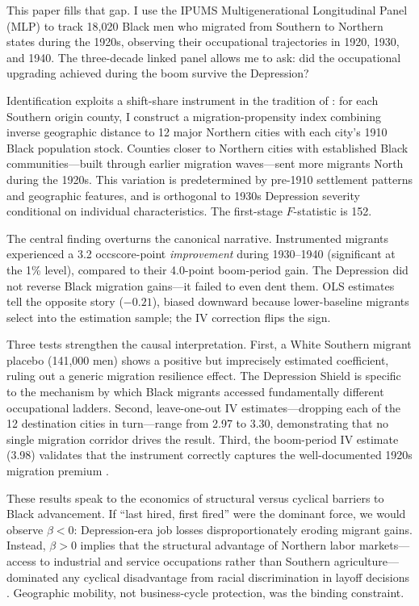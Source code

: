 \documentclass[12pt]{article}
\begin{document}
This paper fills that gap. I use the IPUMS Multigenerational Longitudinal Panel (MLP) to track 18,020 Black men who migrated from Southern to Northern states during the 1920s, observing their occupational trajectories in 1920, 1930, and 1940. The three-decade linked panel allows me to ask: did the occupational upgrading achieved during the boom survive the Depression?

Identification exploits a shift-share instrument in the tradition of \citet{card2001}: for each Southern origin county, I construct a migration-propensity index combining inverse geographic distance to 12 major Northern cities with each city's 1910 Black population stock. Counties closer to Northern cities with established Black communities---built through earlier migration waves---sent more migrants North during the 1920s. This variation is predetermined by pre-1910 settlement patterns and geographic features, and is orthogonal to 1930s Depression severity conditional on individual characteristics. The first-stage $F$-statistic is 152.

The central finding overturns the canonical narrative. Instrumented migrants experienced a 3.2 occscore-point \textit{improvement} during 1930--1940 (significant at the 1\% level), compared to their 4.0-point boom-period gain. The Depression did not reverse Black migration gains---it failed to even dent them. OLS estimates tell the opposite story ($-0.21$), biased downward because lower-baseline migrants select into the estimation sample; the IV correction flips the sign.

Three tests strengthen the causal interpretation. First, a White Southern migrant placebo (141,000 men) shows a positive but imprecisely estimated coefficient, ruling out a generic migration resilience effect. The Depression Shield is specific to the mechanism by which Black migrants accessed fundamentally different occupational ladders. Second, leave-one-out IV estimates---dropping each of the 12 destination cities in turn---range from 2.97 to 3.30, demonstrating that no single migration corridor drives the result. Third, the boom-period IV estimate (3.98) validates that the instrument correctly captures the well-documented 1920s migration premium \citep{collins2014}.

These results speak to the economics of structural versus cyclical barriers to Black advancement. If ``last hired, first fired'' were the dominant force, we would observe $\beta < 0$: Depression-era job losses disproportionately eroding migrant gains. Instead, $\beta > 0$ implies that the structural advantage of Northern labor markets---access to industrial and service occupations rather than Southern agriculture---dominated any cyclical disadvantage from racial discrimination in layoff decisions \citep{margo1995}. Geographic mobility, not business-cycle protection, was the binding constraint.
\end{document}
